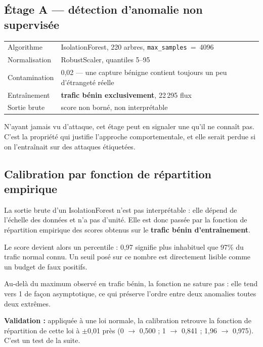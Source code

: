 \documentclass[11pt,a4paper]{article}
\begin{document}
\subsection{Étage A --- détection d'anomalie non supervisée}

\begin{table}[h]\centering\small
\begin{tabularx}{\linewidth}{@{}l X@{}}
\toprule
Algorithme & IsolationForest, 220 arbres, \texttt{max\_samples}~=~4096 \\
Normalisation & RobustScaler, quantiles 5--95 \\
Contamination & 0,02 --- une capture \og{}bénigne\fg{} contient toujours un peu d'étrangeté réelle \\
Entraînement & \textbf{trafic bénin exclusivement}, 22\,295 flux \\
Sortie brute & score non borné, non interprétable \\
\bottomrule
\end{tabularx}
\end{table}

N'ayant jamais vu d'attaque, cet étage peut en signaler une qu'il ne connaît pas. C'est la propriété
qui justifie l'approche comportementale, et elle serait perdue si on l'entraînait sur des attaques
étiquetées.

\subsection{Calibration par fonction de répartition empirique}

La sortie brute d'un IsolationForest n'est pas interprétable : elle dépend de l'échelle des données
et n'a pas d'unité. Elle est donc passée par la fonction de répartition empirique des scores obtenus
sur le \textbf{trafic bénin d'entraînement}.

Le score devient alors un percentile : 0,97 signifie \og{}plus inhabituel que 97\% du trafic normal
connu\fg{}. Un seuil posé sur ce nombre est directement lisible comme un budget de faux positifs.

Au-delà du maximum observé en trafic bénin, la fonction ne sature pas : elle tend vers 1 de façon
asymptotique, ce qui préserve l'ordre entre deux anomalies toutes deux extrêmes.

\textbf{Validation :} appliquée à une loi normale, la calibration retrouve la fonction de répartition
de cette loi à $\pm$0,01 près (0 $\rightarrow$ 0,500 ; 1 $\rightarrow$ 0,841 ; 1,96 $\rightarrow$
0,975). C'est un test de la suite.
\end{document}

